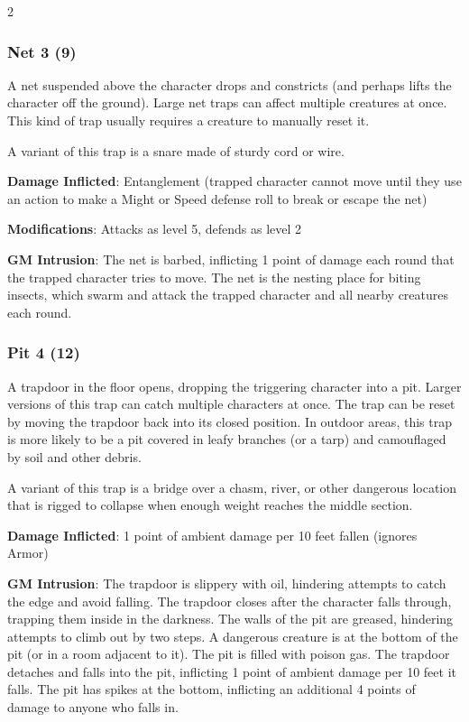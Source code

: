 \begin{multicols}{2}
\subsubsection{Net 3 (9)}

A net suspended above the character drops and constricts (and perhaps lifts the character off the ground). Large net traps can affect multiple creatures at once. This kind of trap usually requires a creature to manually reset it.

A variant of this trap is a snare made of sturdy cord or wire. 

\textbf{Damage Inflicted}: Entanglement (trapped character cannot move until they use an action to make a Might or Speed defense roll to break or escape the net) 

\textbf{Modifications}: Attacks as level 5, defends as level 2 

\textbf{GM Intrusion}: The net is barbed, inflicting 1 point of damage each round that the trapped character tries to move. The net is the nesting place for biting insects, which swarm and attack the trapped character and all nearby creatures each round.

\subsubsection{Pit 4 (12)}

A trapdoor in the floor opens, dropping the triggering character into a pit. Larger versions of this trap can catch multiple characters at once. The trap can be reset by moving the trapdoor back into its closed position. In outdoor areas, this trap is more likely to be a pit covered in leafy branches (or a tarp) and camouflaged by soil and other debris. 

A variant of this trap is a bridge over a chasm, river, or other dangerous location that is rigged to collapse when enough weight reaches the middle section. 

\textbf{Damage Inflicted}: 1 point of ambient damage per 10 feet fallen (ignores Armor) 

\textbf{GM Intrusion}: The trapdoor is slippery with oil, hindering attempts to catch the edge and avoid falling. The trapdoor closes after the character falls through, trapping them inside in the darkness. The walls of the pit are greased, hindering attempts to climb out by two steps. A dangerous creature is at the bottom of the pit (or in a room adjacent to it). The pit is filled with poison gas. The trapdoor detaches and falls into the pit, inflicting 1 point of ambient damage per 10 feet it falls. The pit has spikes at the bottom, inflicting an additional 4 points of damage to anyone who falls in.


\end{multicols}

